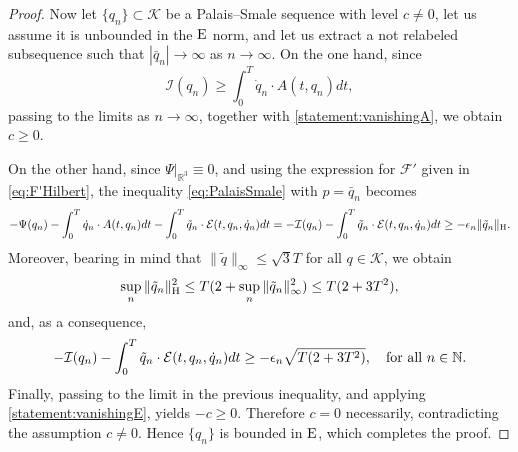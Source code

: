 \documentclass{article}
\newcommand{\boK}{\mathcal{K}}
\newcommand{\boI}{\mathcal{I}}
\newcommand{\R}{\mathbb{R}}
\newcommand{\boF}{\mathcal{F}}
\newcommand{\boE}{\mathcal{E}}
\newcommand{\dq}{\dot{q}}
\newcommand{\Hilb}{{\textnormal H}}
\newcommand{\Ebanach}{{\textnormal E}}
\theoremstyle{definition}
\begin{document}
\begin{proof}
		Now let $\{q_n\}\subset\boK$ be a Palais–Smale sequence with level $c\not=0$, let us assume it is unbounded in the $\Ebanach$ norm, and let us extract a not relabeled subsequence such that $|\bar q_n|\to\infty$ as $n\to\infty$. On the one hand, since
        \begin{equation}\label{ineq:functional-force}
				\boI(q_n)\geq\int_0^T \dq_n\cdot  A(t,q_n)dt,
			\end{equation}
		passing to the limits as $n\to\infty$, together with \eqref{statement:vanishingA}, we obtain $c\geq 0$. 
		
		On the other hand, since $\Psi|_{\R^3}\equiv0$, and using the expression for $\boF'$ given in \eqref{eq:F'Hilbert}, the inequality \eqref{eq:PalaisSmale} with $p=\bar q_n$ becomes
		\begin{equation}
			-\Psi(q_n) - \int_0^T \dq_n\cdot A(t,q_n) dt - \int_0^T \tilde q_n\cdot\boE(t,q_n,\dq_n) dt=-\boI(q_n) - \int_0^T \tilde q_n\cdot\boE(t,q_n,\dq_n) dt \geq -\epsilon_n\|\tilde q_n\|_{\Hilb}.
		\end{equation}
		Moreover, bearing in mind that $\|\tilde q\|_\infty\leq\sqrt{3}T$ for all $q\in\boK$, we obtain
		\[\sup_{n}\|\tilde q_n\|^2_\Hilb\leq T(2+\sup_n\|\tilde q_n\|_\infty^2)\leq T(2+3T^2),\]
			and, as a consequence,
			\begin{equation*}
				-\boI(q_n) - \int_0^T \tilde q_n\cdot\boE(t,q_n,\dq_n)dt \geq -\epsilon_n\sqrt{T(2+3T^2)},\quad\hbox{for all }n\in\mathbb{N}.
			\end{equation*}
		Finally, passing to the limit in the previous inequality, and applying \eqref{statement:vanishingE}, yields $-c\geq 0$. Therefore $c=0$ necessarily, contradicting the assumption  $c\neq0$. Hence $\{q_n\}$ is bounded in $\Ebanach$, which completes the proof.
	\end{proof}
\end{document}
